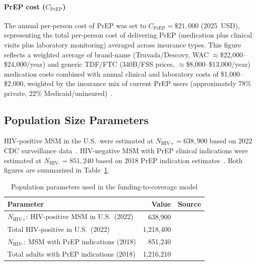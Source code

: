 \documentclass[preprint,12pt]{elsarticle}
\begin{document}
{\paragraph{PrEP cost ($C_{\text{PrEP}}$)}
The annual per-person cost of PrEP was set to $C_{\text{PrEP}} = \$21{,}000$
(2025~USD), representing the total per-person cost of delivering PrEP (medication
plus clinical visits plus laboratory monitoring) averaged across insurance types.
This figure reflects a weighted average of brand-name (Truvada/Descovy, WAC
$\approx$\$22{,}000--\$24{,}000/year) and generic TDF/FTC (340B/FSS prices,
$\approx$\$8{,}000--\$13{,}000/year) medication costs combined with annual
clinical and laboratory costs of \$1{,}000--\$2{,}000, weighted by the insurance
mix of current PrEP users (approximately 78\% private, 22\%
Medicaid/uninsured)~\cite{prepcosts2018}.

\subsection{Population Size Parameters}

HIV-positive MSM in the U.S.\ were estimated at $N_{\text{HIV+}} = 638{,}900$ based on
2022 CDC surveillance data~\cite{Fed_HIV_stats}.
HIV-negative MSM with PrEP clinical indications were estimated at
$N_{\text{HIV-}} = 851{,}240$ based on 2018 PrEP indication estimates~\cite{prepcosts2018}.
Both figures are summarized in Table~\ref{tab:supp-pop-params}.

\begin{table}[htbp]
\centering
\caption{Population parameters used in the funding-to-coverage model}
\label{tab:supp-pop-params}
\begin{tabular}{p{7.8cm}rp{2.7cm}}
\toprule
\textbf{Parameter} & \textbf{Value} & \textbf{Source} \\
\midrule
$N_{\text{HIV+}}$: HIV-positive MSM in U.S.\ (2022)  & 638,900   & \cite{Fed_HIV_stats} \\
Total HIV-positive in U.S.\ (2022)                    & 1,218,400 & \cite{Fed_HIV_stats} \\
$N_{\text{HIV-}}$: MSM with PrEP indications (2018)   & 851,240   & \cite{prepcosts2018} \\
Total adults with PrEP indications (2018)             & 1,216,210 & \cite{prepcosts2018} \\
\bottomrule
\end{tabular}
\end{table}

}
\end{document}
